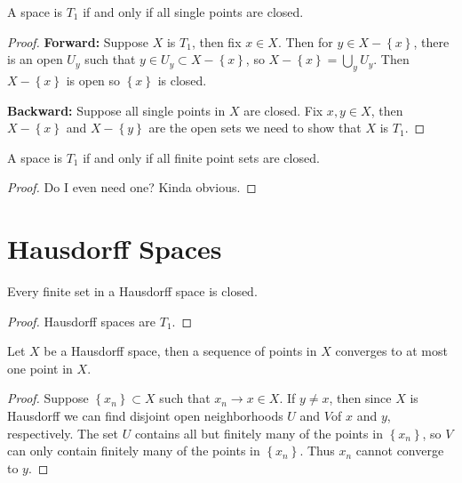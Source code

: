 \documentclass[10pt]{report}
\begin{document}
\begin{prop}
	A space is $T_1$ if and only if all single points are closed.
\end{prop}
\begin{proof}
	\textbf{Forward:} Suppose $X$ is $T_1$, then fix $x \in X$. Then for $y \in X- \left\{ x \right\}$, there is an open $U_{y}$ such that $y \in U_y \subset X - \left\{ x \right\}$, so $X - \left\{ x \right\} = \bigcup_{y}U_y$. Then $X-\left\{ x \right\}$ is open so $\left\{ x \right\}$ is closed.

	\textbf{Backward:} Suppose all single points in $X$ are closed. Fix $x,y \in X$, then $X-\left\{ x \right\}$ and $X-\left\{ y \right\}$ are the open sets we need to show that $X$ is $T_1$.
\end{proof}

\begin{cor}
	A space is $T_1$ if and only if all finite point sets are closed.
\end{cor}
\begin{proof}
	{\color{red}Do I even need one? Kinda obvious.}
\end{proof}


\section{Hausdorff Spaces}

\begin{prop}
	Every finite set in a Hausdorff space is closed.
\end{prop}
\begin{proof}
	Hausdorff spaces are $T_1$.
\end{proof}

\begin{prop}
	Let $X$ be a Hausdorff space, then a sequence of points in $X$ converges to at most one point in $X$.
\end{prop}
\begin{proof}
	Suppose $\left\{ x_n \right\} \subset X$ such that $x_n \to x \in X$. If $y \neq x$, then since $X$ is Hausdorff we can find disjoint open neighborhoods $U$ and $V$of $x$ and $y$, respectively. The set $U$ contains all but finitely many of the points in $\left\{ x_n \right\}$, so $V$ can only contain finitely many of the points in $\left\{ x_n \right\}$. Thus $x_n$ cannot converge to $y$.
\end{proof}
\end{document}
